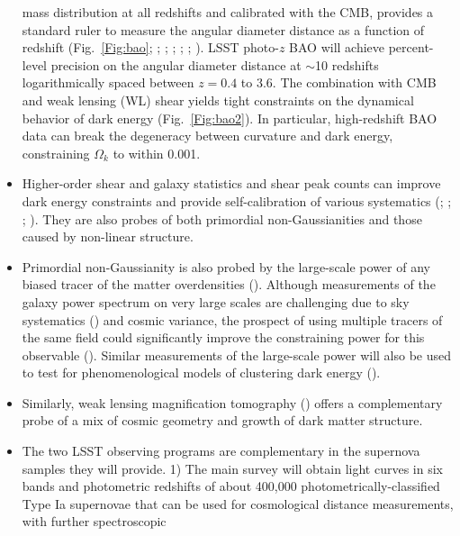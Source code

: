 \begin{itemize}
mass distribution at all redshifts and calibrated with the CMB, provides a standard ruler to measure the angular diameter
distance as a function of redshift (Fig.~\ref{Fig:bao}; \cite{1998ApJ...504L..57E};
\cite{2001ApJ...557L...7C}; \cite{2003ApJ...594..665B}; \cite{2003PhRvD..68f3004H}; \cite{2003PhRvD..68h3504L}; \cite{2003ApJ...598..720S}).
LSST photo-$z$ BAO will achieve percent-level precision on the angular
diameter distance at $\sim$10 redshifts logarithmically spaced between $z = 0.4$ to 3.6. The combination with CMB
and weak lensing (WL) shear yields tight constraints on the
dynamical behavior of dark energy (Fig.~\ref{Fig:bao2}). In particular, high-redshift BAO data can break
the degeneracy between curvature and dark energy, constraining $\Omega_k$ to within
0.001.
\item Higher-order shear and galaxy statistics and shear peak counts can improve dark energy
constraints and provide self-calibration of various systematics (\cite{2004MNRAS.348..897T};
\cite{2006MNRAS.366..884D}; \cite{2006MNRAS.366..101H}; \cite{2016PhRvD..94f3534P}). They are also probes of both
primordial non-Gaussianities and those caused by non-linear structure.
\item Primordial non-Gaussianity is also probed by the large-scale power of any biased tracer of the matter
overdensities (\cite{2008PhRvD..77l3514D}). Although measurements of the galaxy power spectrum on very large scales
are challenging due to sky systematics (\cite{2014PhRvL.113v1301L}) and cosmic variance, the prospect of using
multiple tracers of the same field could significantly improve the constraining power for this observable
(\cite{2009PhRvL.102b1302S}). Similar measurements of the large-scale power will also be used to test for phenomenological
models of clustering dark energy (\cite{2006PhRvD..74d3505T}).
\item Similarly, weak lensing magnification tomography (\cite{2012MNRAS.426.2489M}) offers a
complementary probe of a mix of cosmic geometry and growth of dark matter structure.
\item The two LSST observing programs are complementary in the supernova samples they will provide. 1) The main survey will
obtain light curves in six bands and photometric redshifts of about 400,000 photometrically-classified Type
Ia supernovae that can be used for cosmological distance measurements, with further spectroscopic

\end{itemize}

